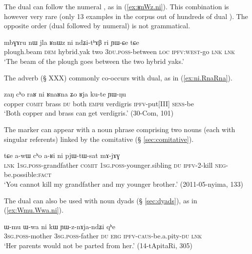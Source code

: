 The dual can follow the numeral , as in (\ref{ex:ʁnWz.ni}). This combination is however very rare (only 13 examples in the corpus out of hundreds of dual ). The opposite order (dual followed by numeral) is not grammatical.

\begin{exe}
\ex \label{ex:ʁnWz.ni}
\gll mbɣɤru nɯ jla ʁnɯz ni ndʑi-tʰɤβ ri ɲɯ-ɕe tɕe \\
plough.beam \textsc{dem} hybrid.yak two \textsc{3du}.\textsc{poss}-between \textsc{loc} \textsc{ipfv}:\textsc{west}-go \textsc{lnk} \textsc{lnk} \\
\glt `The beam of the plough goes between the two hybrid yaks.' 
\end{exe}


The adverb  (§ XXX) commonly co-occurs with dual, as in (\ref{ex:ni.RnaRna}).

\begin{exe}
\ex \label{ex:ni.RnaRna}
\gll zaŋ cʰo raʁ ni ʁnaʁna ʑo ʁja ku-te ɲɯ-ŋu \\
copper \textsc{comit} brass \textsc{du} both \textsc{emph} verdigris \textsc{ipfv}-put[III] \textsc{sens}-be \\
\glt `Both copper and brass can get verdigris.' (30-Com, 101)
\end{exe}

The marker  can appear with a noun phrase comprising two nouns (each with singular referents) linked by the comitative  (§ \ref{sec:comitative}).

\begin{exe}
\ex \label{ex:awW.cho.aRi.ni}
\gll  tɕe a-wɯ cʰo a-ʁi ni pjɯ-tɯ-sat mɤ-jɤɣ \\
\textsc{lnk} \textsc{1sg}.\textsc{poss}-grandfather \textsc{comit} \textsc{1sg}.\textsc{poss}-younger.sibling \textsc{du} \textsc{ipfv}-2-kill \textsc{neg}-be.possible:\textsc{fact} \\
\glt `You cannot kill my grandfather and my younger brother.' (2011-05-nyima, 133)
\end{exe}

The dual can also be used with noun dyads (§ \ref{sec:dyads}), as in (\ref{ex:Wmu.Wwa.ni}). 

\begin{exe}
\ex \label{ex:Wmu.Wwa.ni}
\gll   ɯ-mu ɯ-wa ni kɯ ɲɯ-z-nɤja-ndʑi qʰe \\
\textsc{3sg}.\textsc{poss}-mother \textsc{3sg}.\textsc{poss}-father \textsc{du} \textsc{erg} \textsc{ipfv}-\textsc{caus}-be.a.pity-\textsc{du} \textsc{lnk} \\
\glt `Her parents would not be parted from her.' (14-tApitaRi, 305)
\end{exe}

